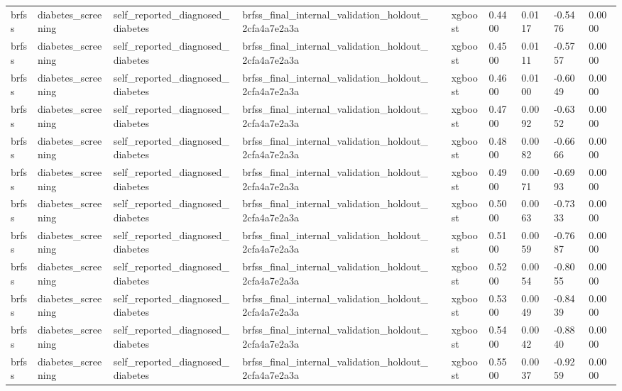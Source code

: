 \begin{tabular}{llllllllll}
brfss & diabetes\_screening & self\_reported\_diagnosed\_diabetes & brfss\_final\_internal\_validation\_holdout\_2cfa4a7e2a3a &  & xgboost & 0.4400 & 0.0117 & -0.5476 & 0.0000 \\
brfss & diabetes\_screening & self\_reported\_diagnosed\_diabetes & brfss\_final\_internal\_validation\_holdout\_2cfa4a7e2a3a &  & xgboost & 0.4500 & 0.0111 & -0.5757 & 0.0000 \\
brfss & diabetes\_screening & self\_reported\_diagnosed\_diabetes & brfss\_final\_internal\_validation\_holdout\_2cfa4a7e2a3a &  & xgboost & 0.4600 & 0.0100 & -0.6049 & 0.0000 \\
brfss & diabetes\_screening & self\_reported\_diagnosed\_diabetes & brfss\_final\_internal\_validation\_holdout\_2cfa4a7e2a3a &  & xgboost & 0.4700 & 0.0092 & -0.6352 & 0.0000 \\
brfss & diabetes\_screening & self\_reported\_diagnosed\_diabetes & brfss\_final\_internal\_validation\_holdout\_2cfa4a7e2a3a &  & xgboost & 0.4800 & 0.0082 & -0.6666 & 0.0000 \\
brfss & diabetes\_screening & self\_reported\_diagnosed\_diabetes & brfss\_final\_internal\_validation\_holdout\_2cfa4a7e2a3a &  & xgboost & 0.4900 & 0.0071 & -0.6993 & 0.0000 \\
brfss & diabetes\_screening & self\_reported\_diagnosed\_diabetes & brfss\_final\_internal\_validation\_holdout\_2cfa4a7e2a3a &  & xgboost & 0.5000 & 0.0063 & -0.7333 & 0.0000 \\
brfss & diabetes\_screening & self\_reported\_diagnosed\_diabetes & brfss\_final\_internal\_validation\_holdout\_2cfa4a7e2a3a &  & xgboost & 0.5100 & 0.0059 & -0.7687 & 0.0000 \\
brfss & diabetes\_screening & self\_reported\_diagnosed\_diabetes & brfss\_final\_internal\_validation\_holdout\_2cfa4a7e2a3a &  & xgboost & 0.5200 & 0.0054 & -0.8055 & 0.0000 \\
brfss & diabetes\_screening & self\_reported\_diagnosed\_diabetes & brfss\_final\_internal\_validation\_holdout\_2cfa4a7e2a3a &  & xgboost & 0.5300 & 0.0049 & -0.8439 & 0.0000 \\
brfss & diabetes\_screening & self\_reported\_diagnosed\_diabetes & brfss\_final\_internal\_validation\_holdout\_2cfa4a7e2a3a &  & xgboost & 0.5400 & 0.0042 & -0.8840 & 0.0000 \\
brfss & diabetes\_screening & self\_reported\_diagnosed\_diabetes & brfss\_final\_internal\_validation\_holdout\_2cfa4a7e2a3a &  & xgboost & 0.5500 & 0.0037 & -0.9259 & 0.0000 \\

\end{tabular}
